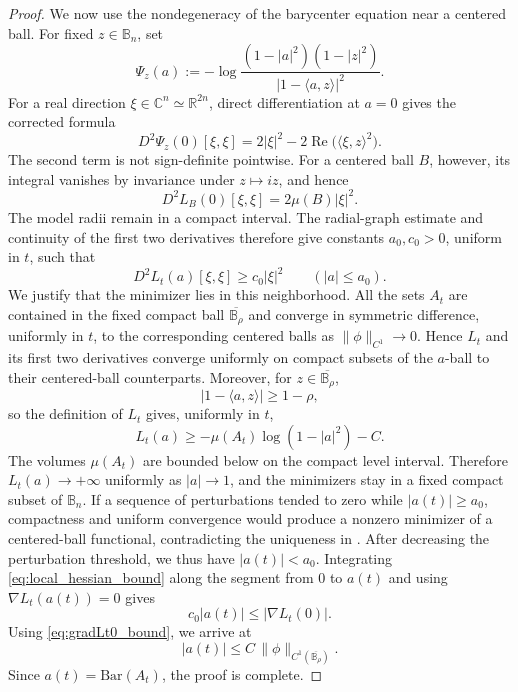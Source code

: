 \documentclass[11pt]{amsart}
\theoremstyle{plain}
\theoremstyle{definition}
\theoremstyle{remark}
\newcommand{\B}{\mathbb{B}}
\newcommand{\R}{\mathbb{R}}
\newcommand{\C}{\mathbb{C}}
\begin{document}
\begin{proof}
We now use the nondegeneracy of the barycenter equation near a centered ball.
For fixed \(z\in\B_n\), set
\[
\Psi_z(a):=
-\log\frac{(1-|a|^2)(1-|z|^2)}{|1-\langle a,z\rangle|^2}.
\]
For a real direction $\xi\in\C^n\simeq\R^{2n}$, direct differentiation at
$a=0$ gives the corrected formula
\begin{equation}\label{eq:correct_hessian_integrand}
D^2\Psi_z(0)[\xi,\xi]
=2|\xi|^2-2\operatorname{Re}\bigl(\langle\xi,z\rangle^2\bigr).
\end{equation}
The second term is not sign-definite pointwise.  For a centered ball $B$,
however, its integral vanishes by invariance under $z\mapsto iz$, and hence
\begin{equation}\label{eq:ball_hessian}
D^2L_B(0)[\xi,\xi]=2\mu(B)|\xi|^2.
\end{equation}
The model radii remain in a compact interval. The radial-graph estimate and
continuity of the first two derivatives therefore give constants $a_0,c_0>0$,
uniform in $t$, such that
\begin{equation}\label{eq:local_hessian_bound}
D^2L_t(a)[\xi,\xi]\ge c_0|\xi|^2\qquad (|a|\le a_0).
\end{equation}
We justify that the minimizer lies in this neighborhood. All the sets $A_t$
are contained in the fixed compact ball $\overline{\B_\rho}$ and converge in
symmetric difference, uniformly in $t$, to the corresponding centered balls
as $\|\phi\|_{C^1}\to0$. Hence $L_t$ and its first two derivatives converge
uniformly on compact subsets of the $a$-ball to their centered-ball
counterparts. Moreover, for $z\in\overline{\B_\rho}$,
\[
 |1-\langle a,z\rangle|\ge1-\rho,
\]
so the definition of $L_t$ gives, uniformly in $t$,
\[
 L_t(a)\ge-\mu(A_t)\log(1-|a|^2)-C.
\]
The volumes $\mu(A_t)$ are bounded below on the compact level interval.
Therefore $L_t(a)\to+\infty$ uniformly as $|a|\to1$, and the minimizers stay
in a fixed compact subset of $\B_n$. If a sequence of perturbations tended to
zero while $|a(t)|\ge a_0$, compactness and uniform convergence would produce
a nonzero minimizer of a centered-ball functional, contradicting the
uniqueness in \cite[Theorem~5.1]{JacimovicKalajAnnFennMath}. After decreasing
the perturbation threshold, we thus have $|a(t)|<a_0$. Integrating
\eqref{eq:local_hessian_bound} along the segment from $0$ to $a(t)$ and using
$\nabla L_t(a(t))=0$ gives
\[
c_0|a(t)|\le |\nabla L_t(0)|.
\]
Using \eqref{eq:gradLt0_bound}, we arrive at
\[
|a(t)|
\le
C\,\|\phi\|_{C^1(\overline{\B_\rho})}.
\]
Since \(a(t)=\mathrm{Bar}(A_t)\), the proof is complete.
\end{proof}
\end{document}
